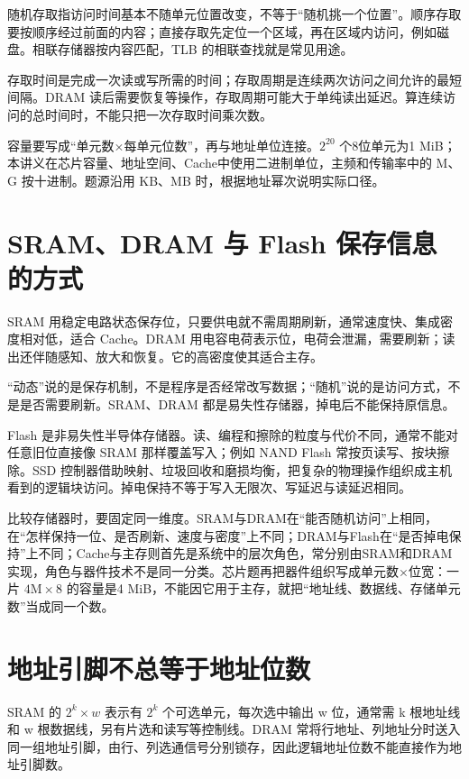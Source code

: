 随机存取指访问时间基本不随单元位置改变，不等于``随机挑一个位置''。顺序存取要按顺序经过前面的内容；直接存取先定位一个区域，再在区域内访问，例如磁盘。相联存储器按内容匹配，TLB 的相联查找就是常见用途。

存取时间是完成一次读或写所需的时间；存取周期是连续两次访问之间允许的最短间隔。DRAM 读后需要恢复等操作，存取周期可能大于单纯读出延迟。算连续访问的总时间时，不能只把一次存取时间乘次数。

容量要写成``单元数×每单元位数''，再与地址单位连接。\(2^{20}\) 个8位单元为1 MiB；本讲义在芯片容量、地址空间、Cache中使用二进制单位，主频和传输率中的 M、G 按十进制。题源沿用 KB、MB 时，根据地址幂次说明实际口径。

\section{SRAM、DRAM 与 Flash 保存信息的方式}\label{co-03-02}

SRAM 用稳定电路状态保存位，只要供电就不需周期刷新，通常速度快、集成密度相对低，适合 Cache。DRAM 用电容电荷表示位，电荷会泄漏，需要刷新；读出还伴随感知、放大和恢复。它的高密度使其适合主存。

``动态''说的是保存机制，不是程序是否经常改写数据；``随机''说的是访问方式，不是是否需要刷新。SRAM、DRAM 都是易失性存储器，掉电后不能保持原信息。

Flash 是非易失性半导体存储器。读、编程和擦除的粒度与代价不同，通常不能对任意旧位直接像 SRAM 那样覆盖写入；例如 NAND Flash 常按页读写、按块擦除。SSD 控制器借助映射、垃圾回收和磨损均衡，把复杂的物理操作组织成主机看到的逻辑块访问。掉电保持不等于写入无限次、写延迟与读延迟相同。

比较存储器时，要固定同一维度。SRAM与DRAM在``能否随机访问''上相同，在``怎样保持一位、是否刷新、速度与密度''上不同；DRAM与Flash在``是否掉电保持''上不同；Cache与主存则首先是系统中的层次角色，常分别由SRAM和DRAM实现，角色与器件技术不是同一分类。芯片题再把器件组织写成单元数×位宽：一片 \(4\mathrm M\times8\) 的容量是4 MiB，不能因它用于主存，就把``地址线、数据线、存储单元数''当成同一个数。

\section{地址引脚不总等于地址位数}\label{co-03-03}

SRAM 的 \(2^k\times w\) 表示有 \(2^k\) 个可选单元，每次选中输出 w 位，通常需 k 根地址线和 w 根数据线，另有片选和读写等控制线。DRAM 常将行地址、列地址分时送入同一组地址引脚，由行、列选通信号分别锁存，因此逻辑地址位数不能直接作为地址引脚数。

